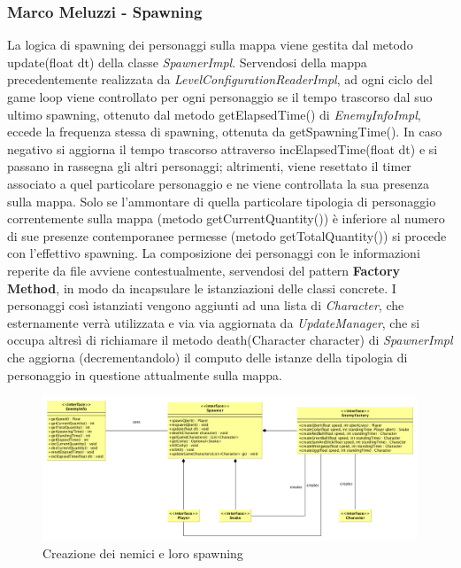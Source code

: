 \documentclass[a4paper,12pt, hidelinks]{report}
\begin{document}
\begin{flushright}
\item\subsubsection{Marco Meluzzi - Spawning}
\end{flushright}

La logica di spawning dei personaggi sulla mappa viene gestita dal metodo update(float dt) della classe \emph{SpawnerImpl}. Servendosi della mappa precedentemente realizzata da \emph{LevelConfigurationReaderImpl}, ad ogni ciclo del game loop viene controllato per ogni personaggio se il tempo trascorso dal suo ultimo spawning, ottenuto dal metodo getElapsedTime() di \emph{EnemyInfoImpl}, eccede la frequenza stessa di spawning, ottenuta da getSpawningTime(). In caso negativo si aggiorna il tempo trascorso attraverso incElapsedTime(float dt) e si passano in rassegna gli altri personaggi; altrimenti, viene resettato il timer associato a quel particolare personaggio e ne viene controllata la sua presenza sulla mappa. Solo se l'ammontare di quella particolare tipologia di personaggio correntemente sulla mappa (metodo getCurrentQuantity()) è inferiore al numero di sue presenze contemporanee permesse (metodo getTotalQuantity()) si procede con l'effettivo spawning. La composizione dei personaggi con le informazioni reperite da file avviene contestualmente, servendosi del pattern \textbf{Factory Method}, in modo da incapsulare le istanziazioni delle classi concrete. I personaggi così istanziati vengono aggiunti ad una lista di \emph{Character}, che esternamente verrà utilizzata e via via aggiornata da \emph{UpdateManager}, che si occupa altresì di richiamare il metodo death(Character character) di \emph{SpawnerImpl} che aggiorna (decrementandolo) il computo delle istanze della tipologia di personaggio in questione attualmente sulla mappa.

\begin{figure}[H]
\centering{}
\includegraphics[width=\linewidth]{img/CreazioneNemiciESpawner}
\caption{Creazione dei nemici e loro spawning}
\label{img:CreazioneNemiciESpawner}
\end{figure}
\end{document}
